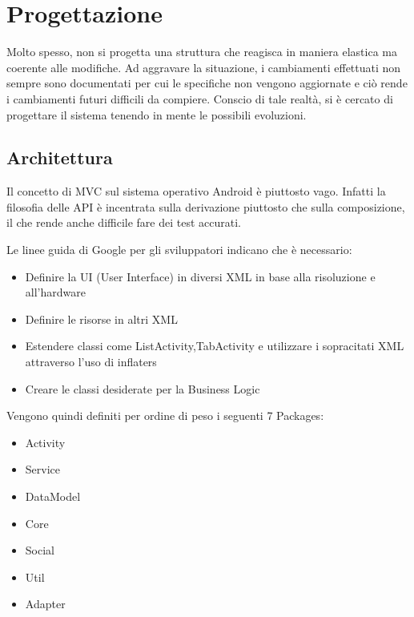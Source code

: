 \chapter{Progettazione} %

\label{Capitolo4} %


Molto spesso, non si progetta una struttura che reagisca in maniera elastica ma coerente alle modifiche.
Ad aggravare la situazione, i cambiamenti effettuati non sempre sono documentati per cui le specifiche non vengono aggiornate e ciò rende i cambiamenti futuri difficili da compiere. Conscio di tale realtà, si è cercato di progettare il sistema tenendo in mente le possibili evoluzioni.

\section{Architettura}



Il concetto di MVC sul sistema operativo Android è piuttosto vago. Infatti la filosofia delle API è incentrata sulla derivazione piuttosto che sulla composizione, il che rende anche difficile fare dei test accurati.

Le linee guida di Google per gli sviluppatori indicano che è necessario:

\begin{itemize}
\item Definire la UI (User Interface) in diversi XML in base alla risoluzione e all'hardware
\item Definire le risorse in altri XML
\item Estendere classi come ListActivity,TabActivity e utilizzare i sopracitati XML attraverso l'uso di inflaters
\item Creare le classi desiderate per la Business Logic
\end{itemize}

Vengono quindi definiti per ordine di peso i seguenti 7 Packages:

\begin{itemize}
\item Activity
\item Service
\item DataModel
\item Core
\item Social
\item Util
\item Adapter
\end{itemize}

